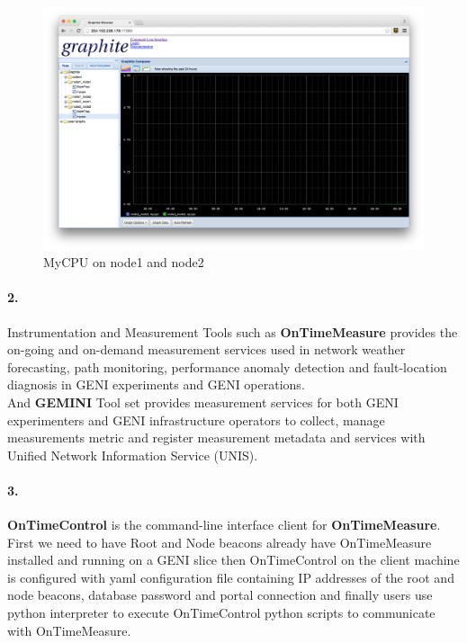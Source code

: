 \documentclass[a4paper]{article}
\begin{document}
\begin{figure}[H]
  \centering
    \includegraphics[scale=.32]{mycpu.png}
  \caption{MyCPU on node1 and node2}
\end{figure}

\paragraph{2. } Instrumentation and Measurement Tools such as \textbf{OnTimeMeasure} provides the on-going and on-demand measurement services used in network weather forecasting, path monitoring, performance anomaly detection and fault-location diagnosis in GENI experiments and GENI operations. \\
And \textbf{GEMINI} Tool set provides measurement services for both GENI experimenters and GENI infrastructure operators to collect, manage measurements metric and register measurement metadata and services with Unified Network Information Service (UNIS).

\paragraph{3. } \textbf{OnTimeControl} is the command-line interface client for \textbf{OnTimeMeasure}. First we need to have Root and Node beacons already have OnTimeMeasure installed and running on a GENI slice then OnTimeControl on the client machine is configured with yaml configuration file containing IP addresses of the root and node beacons, database password and portal connection and finally users use python interpreter to execute OnTimeControl python scripts to communicate with OnTimeMeasure.
\end{document}
